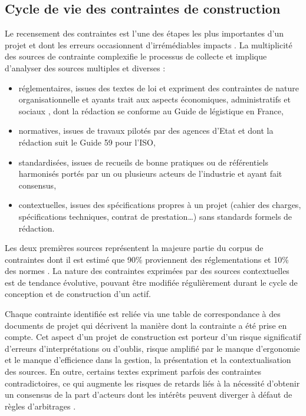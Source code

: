 \documentclass[a4paper,12pt]{article}
\begin{document}
\subsection{Cycle de vie des contraintes de construction}
\label{sec:orge9f62f3}
Le recensement des contraintes est l’une des étapes les plus importantes d’un projet et dont les erreurs occasionnent d’irrémédiables impacts \autocite{mabeloRequirementsManagementProject2025a}. La multiplicité des sources de contrainte complexifie le processus de collecte et implique d’analyser des sources multiples et diverses : 
\begin{itemize}
\item réglementaires, issues des textes de loi et expriment des contraintes de nature organisationnelle et ayants trait aux aspects économiques, administratifs et sociaux \autocite{devinazRapportDinformationFait2023}, dont la rédaction se conforme au Guide de légistique \autocite{GuideLegistique2017a} en France,
\item normatives, issues de travaux pilotés par des agences d’Etat et dont la rédaction suit le Guide 59 \autocite{PratiquesNormalisationRecommandees2019a} pour l’ISO,
\item standardisées, issues de recueils de bonne pratiques ou de référentiels harmonisés portés par un ou plusieurs acteurs de l’industrie et ayant fait consensus,
\item contextuelles, issues des spécifications propres à un projet (cahier des charges, spécifications techniques, contrat de prestation\ldots{}) sans standards formels de rédaction.
\end{itemize}

Les deux premières sources représentent la majeure partie du corpus de contraintes dont il est estimé que 90\% proviennent des réglementations et 10\% des normes \autocite{baudetTropNormesAFNOR2024}. La nature des contraintes exprimées par des sources contextuelles est de tendance évolutive, pouvant être modifiée régulièrement durant le cycle de conception et de construction d’un actif.

Chaque contrainte identifiée est reliée via une table de correspondance à des documents de projet qui décrivent la manière dont la contrainte a été prise en compte. Cet aspect d’un projet de construction est porteur d’un risque significatif d'erreurs d'interprétations ou d'oublis,  risque amplifié par le manque d'ergonomie et le manque d'efficience dans la gestion, la présentation et la contextualisation des sources. En outre, certains textes expriment parfois des contraintes contradictoires, ce qui augmente les risques de retards liés à la nécessité d’obtenir un consensus de la part d’acteurs dont les intérêts peuvent diverger  à défaut de règles d’arbitrages \autocite{EntryForceEuropean2024a,robertorodriguezCoherenceOuContradiction2022}.
\end{document}
